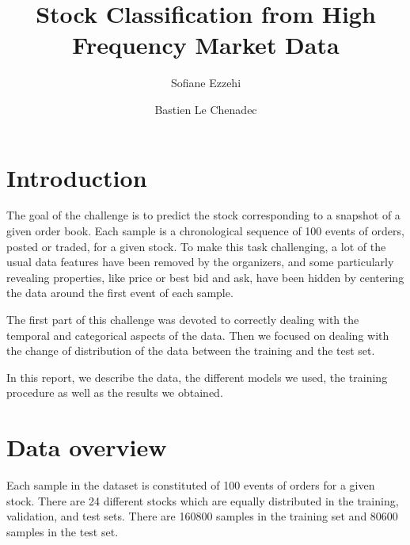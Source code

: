 \documentclass[switch, 11pt]{article}
\title{Stock Classification from High Frequency Market Data}
\author[1]{Sofiane Ezzehi}
\author[1]{Bastien Le Chenadec}
\affil[1]{École des Ponts ParisTech, Master MVA}
\begin{document}
\maketitle

\begin{contribstatement}
\end{contribstatement}

\begin{multicols}{2}
    \section{Introduction}

    The goal of the challenge is to predict the stock corresponding to a snapshot of a given order book. Each sample is a chronological sequence of 100 events of orders, posted or traded, for a given stock. To make this task challenging, a lot of the usual data features have been removed by the organizers, and some particularly revealing properties, like price or best bid and ask, have been hidden by centering the data around the first event of each sample.

    The first part of this challenge was devoted to correctly dealing with the temporal and categorical aspects of the data. Then we focused on dealing with the change of distribution of the data between the training and the test set.

    In this report, we describe the data, the different models we used, the training procedure as well as the results we obtained.

    \section{Data overview}

    Each sample in the dataset is constituted of 100 events of orders for a given stock. There are 24 different stocks which are equally distributed in the training, validation, and test sets. There are 160800 samples in the training set and 80600 samples in the test set.


\end{multicols}
\end{document}
